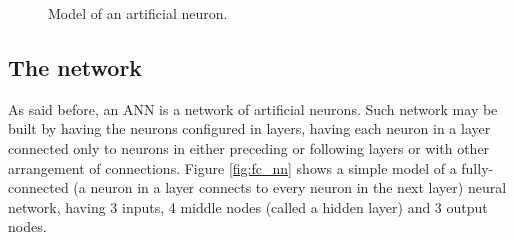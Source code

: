 \begin{figure}[ht]
	\centering
	\caption{Model of an artificial neuron.} \label{fig:neuron}
\end{figure}

\subsection{The network}

As said before, an ANN is a network of artificial neurons. Such network may be built by having the neurons configured in layers, having each neuron in a layer connected only to neurons in either preceding or following layers or with other arrangement of connections. Figure \ref{fig:fc_nn} shows a simple model of a fully-connected (a neuron in a layer connects to every neuron in the next layer) neural network, having 3 inputs, 4 middle nodes (called a hidden layer) and 3 output nodes.

